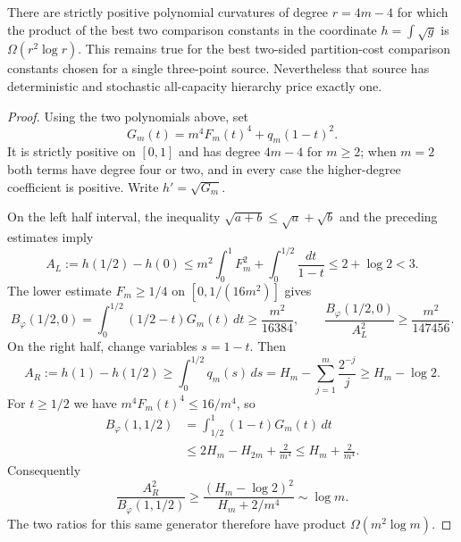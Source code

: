 \begin{proposition}
There are strictly positive polynomial curvatures of degree $r=4m-4$
for which the product of the best two comparison constants in the
coordinate $h=\int\sqrt g$ is $\Omega(r^2\log r)$. This remains true
for the best two-sided partition-cost comparison constants chosen for a
single three-point source. Nevertheless that source has deterministic
and stochastic all-capacity hierarchy price exactly one.
\end{proposition}
\begin{proof}
Using the two polynomials above, set
\[
 G_m(t)=m^4F_m(t)^4+q_m(1-t)^2.
\]
It is strictly positive on $[0,1]$ and has degree $4m-4$ for $m\geq2$;
when $m=2$ both terms have degree four or two, and in every case the
higher-degree coefficient is positive. Write $h'=\sqrt{G_m}$.

On the left half interval, the inequality
$\sqrt{a+b}\leq\sqrt a+\sqrt b$ and the preceding estimates imply
\[
 A_L:=h(1/2)-h(0)
 \leq m^2\int_0^1F_m^2+\int_0^{1/2}\frac{dt}{1-t}
 \leq2+\log2<3.
\]
The lower estimate $F_m\geq1/4$ on $[0,1/(16m^2)]$ gives
\[
 B_\varphi(1/2,0)
 =\int_0^{1/2}(1/2-t)G_m(t)\,dt
 \geq\frac{m^2}{16384},\qquad
 \frac{B_\varphi(1/2,0)}{A_L^2}\geq\frac{m^2}{147456}.
\]
On the right half, change variables $s=1-t$. Then
\[
 A_R:=h(1)-h(1/2)
 \geq\int_0^{1/2}q_m(s)\,ds
 =H_m-\sum_{j=1}^m\frac{2^{-j}}j\geq H_m-\log2.
\]
For $t\geq1/2$ we have $m^4F_m(t)^4\leq16/m^4$, so
\[
 \begin{split}
 B_\varphi(1,1/2)
 &=\int_{1/2}^1(1-t)G_m(t)\,dt\\
 &\leq 2H_m-H_{2m}+\frac2{m^4}
 \leq H_m+\frac2{m^4}.
 \end{split}
\]
Consequently
\[
 \frac{A_R^2}{B_\varphi(1,1/2)}
 \geq\frac{(H_m-\log2)^2}{H_m+2/m^4}\sim\log m.
\]
The two ratios for this same generator therefore have product
$\Omega(m^2\log m)$.


\end{proof}
